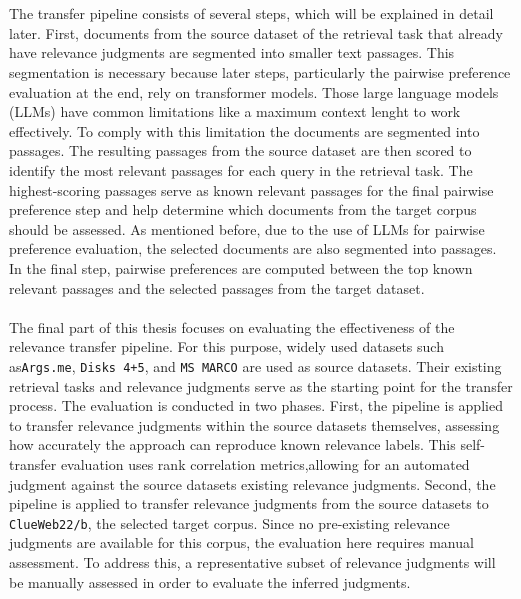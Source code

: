 \\\\
The transfer pipeline consists of several steps, which will be explained in detail later. First, documents from the source dataset of the retrieval task that already have relevance judgments are segmented into smaller text passages. This segmentation is necessary because later steps, particularly the pairwise preference evaluation at the end, rely on transformer models. Those large language models (LLMs) have common limitations like a maximum context lenght to work effectively. To comply with this limitation the documents are segmented into passages. The resulting passages from the source dataset are then scored to identify the most relevant passages for each query in the retrieval task. The highest-scoring passages serve as known relevant passages for the final pairwise preference step and help determine which documents from the target corpus should be assessed. As mentioned before, due to the use of LLMs for pairwise preference evaluation, the selected documents are also segmented into passages. In the final step, pairwise preferences are computed between the top known relevant passages and the selected passages from the target dataset.
\\\\
The final part of this thesis focuses on evaluating the effectiveness of the relevance transfer pipeline. For this purpose, widely used datasets such as\texttt{Args.me}, \texttt{Disks 4+5}, and \texttt{MS MARCO} are used  as source datasets. Their existing retrieval tasks and relevance judgments serve as the starting point for the transfer process. The evaluation is conducted in two phases. First, the pipeline is applied to transfer relevance judgments within the source datasets themselves, assessing how accurately the approach can reproduce known relevance labels. This self-transfer evaluation uses rank correlation metrics,allowing for an automated judgment against the source datasets existing relevance judgments. Second, the pipeline is applied to transfer relevance judgments from the source datasets to \texttt{ClueWeb22/b}, the selected target corpus. Since no pre-existing relevance judgments are available for this corpus, the evaluation here requires manual assessment. To address this, a representative subset of relevance judgments will be manually assessed in order to evaluate the inferred judgments.
